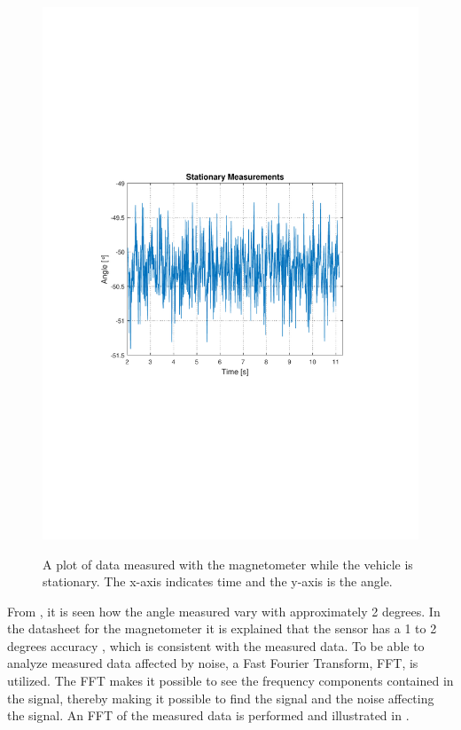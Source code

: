 \begin{figure}[H]
  \centering
  {
    \includegraphics[width=1.1\textwidth]{figures/StationaryMeasurements.pdf}
  }
  \caption{A plot of data measured with the magnetometer while the vehicle is stationary. The x-axis indicates time and the y-axis is the angle.}
  \label{fig:StationaryMeasurementsMagnato}
\end{figure}

From , it is seen how the angle measured vary with approximately 2 degrees. In the datasheet for the magnetometer it is explained that the sensor has a 1 to 2 degrees accuracy \cite{HMC5883L}, which is consistent with the measured data. To be able to analyze measured data affected by noise, a Fast Fourier Transform, FFT, is utilized. The FFT makes it possible to see the frequency components contained in the signal, thereby making it possible to find the signal and the noise affecting the signal. An FFT of the measured data is performed and illustrated in .

